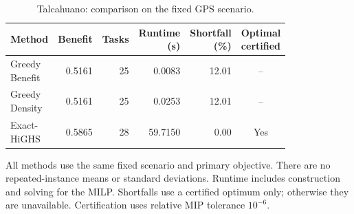 \begin{table}[!htbp]
\centering
\caption{Talcahuano: comparison on the fixed GPS scenario.}
\label{tab:gps-three-methods}
\scriptsize
\setlength{\tabcolsep}{3pt}
\renewcommand{\arraystretch}{1.08}
\begin{tabular}{@{}lrrrrc@{}}
\toprule
Method & Benefit & Tasks & \makecell{Runtime\\(s)} & \makecell{Shortfall\\(\%)} & \makecell{Optimal\\certified} \\
\midrule
\makecell[l]{Greedy\\Benefit} & 0.5161 & 25 & 0.0083 & 12.01 & -- \\
\makecell[l]{Greedy\\Density} & 0.5161 & 25 & 0.0253 & 12.01 & -- \\
\makecell[l]{Exact-\\HiGHS} & 0.5865 & 28 & 59.7150 & 0.00 & Yes \\
\bottomrule
\end{tabular}
\begin{minipage}{0.98\columnwidth}
\footnotesize
All methods use the same fixed scenario and primary objective. There are no repeated-instance means or standard deviations. Runtime includes construction and solving for the MILP. Shortfalls use a certified optimum only; otherwise they are unavailable. Certification uses relative MIP tolerance $10^{-6}$.
\end{minipage}
\end{table}
